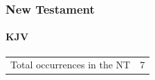 				
			
		
		
	\subsubsection{New Testament} %
		\label{IDLENESS-NT}
	
		\paragraph{KJV}
			\label{IDLENESS-NT-KJV}
	
			\begin{tabular}{ll}
				Total occurrences in the NT & 7
			\end{tabular}
			
